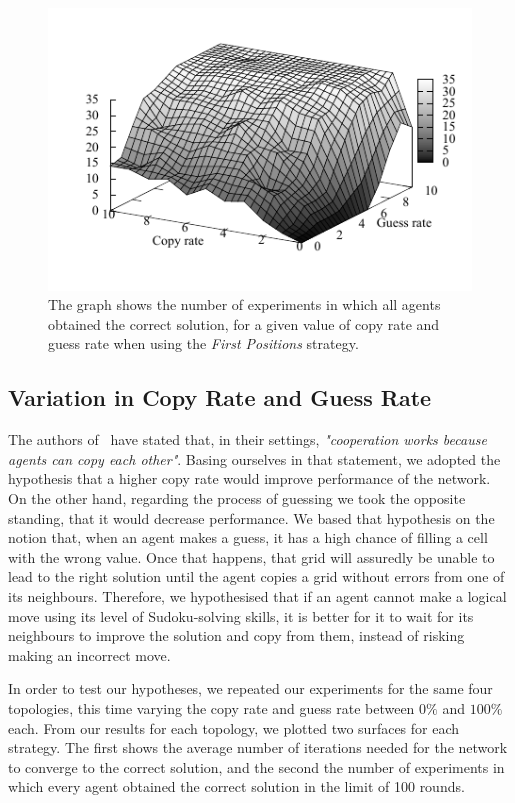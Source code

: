 \documentclass{article}
\begin{document}
\begin{figure}
\includegraphics[scale=1]{ijcai_sudoku/first_suc}
\caption{The graph shows the number of experiments in which all agents obtained the correct solution, for a given value of copy rate and guess rate when using the \emph{First Positions} strategy.
}
\label{fig:first_suc}
\end{figure}

\subsection{Variation in Copy Rate and Guess Rate}

The authors of~\cite{farenzena:collabem} have stated that, in their settings, {\em "cooperation works because agents can copy each other"}. Basing ourselves in that statement, we adopted the hypothesis that a higher copy rate would improve performance of the network. On the other hand, regarding the process of guessing we took the opposite standing, that it would decrease performance. We based that hypothesis on the notion that, when an agent makes a guess, it has a high chance of filling a cell with the wrong value. Once that happens, that grid will assuredly be unable to lead to the right solution until the agent copies a grid without errors from one of its neighbours. Therefore, we hypothesised that if an agent cannot make a logical move using its level of Sudoku-solving skills, it is better for it to wait for its neighbours to improve the solution and copy from them, instead of risking making an incorrect move.

In order to test our hypotheses, we repeated our experiments for the same four topologies, this time varying the copy rate and guess rate between $0\%$ and $100\%$ each. From our results for each topology, we plotted two surfaces for each strategy. The first shows the average number of iterations needed for the network to converge to the correct solution, and the second the number of experiments in which every agent obtained the correct solution in the limit of 100 rounds.
\end{document}
